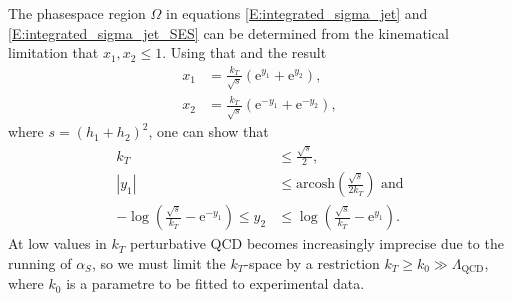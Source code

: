 \documentclass[a4paper, twoside, english, 12pt]{article}
\begin{document}
The phasespace region $\Omega$ in equations \eqref{E:integrated_sigma_jet} and \eqref{E:integrated_sigma_jet_SES} can be determined from the kinematical limitation that $x_1, x_2 \leq 1$. Using that and the result
\begin{align}
	x_1 &= \frac{k_T}{\sqrt{s}}\left(\mathrm{e}^{y_1}+\mathrm{e}^{y_2}\right)\label{E:x1_from_ktandys} ,\\[1em]
	x_2 &= \frac{k_T}{\sqrt{s}}\left(\mathrm{e}^{-y_1}+\mathrm{e}^{-y_2}\right)\label{E:x2_from_ktandys} , 
\end{align}
where $s = (h_1+h_2)^2$, one can show that 
\begin{align}
	k_T &\leq \frac{\sqrt{s}}{2}, \label{E:kt_limit} \\[1em]
	|y_1| &\leq \text{arcosh}\left(\frac{\sqrt{s}}{2k_T}\right) \text{ and} \label{E:y1_limits} \\[1em]
	-\log\left(\frac{\sqrt{s}}{k_T}-\mathrm{e}^{-y_1}\right) \leq y_2 &\leq \log\left(\frac{\sqrt{s}}{k_T}-\mathrm{e}^{y_1}\right)  \label{E:y2_limits} .
\end{align}
At low values in $k_T$ perturbative QCD becomes increasingly imprecise due to the running of $\alpha_S$, so we must limit the $k_T$-space by a restriction $k_T\geq k_0 \gg \Lambda_{\text{QCD}}$, where $k_0$ is a parametre to be fitted to experimental data.
\end{document}
